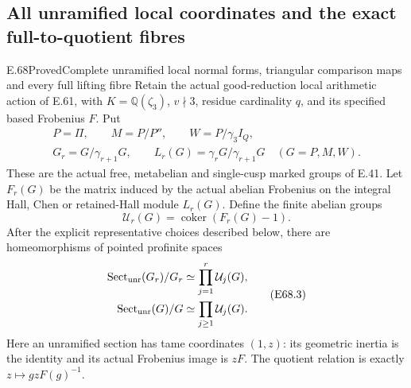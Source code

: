\subsection{All unramified local coordinates and the exact full-to-quotient fibres}

\begin{statement}{E.68}{Proved}{Complete unramified local normal forms, triangular comparison maps and every full lifting fibre}
Retain the actual good-reduction local arithmetic action of E.61,
with $K=\mathbb Q(\zeta_3)$, $v\nmid3$, residue cardinality $q$,
and its specified based Frobenius $F$. Put
\[
 \begin{gathered}
 P=\Pi,\qquad M=P/P'',\qquad W=P/\gamma_3I_Q,\\
 G_r=G/\gamma_{r+1}G,\qquad
 L_r(G)=\gamma_rG/\gamma_{r+1}G\quad(G=P,M,W).
 \end{gathered}
 \tag{E68.1}
\]
These are the actual free, metabelian and single-cusp marked
groups of E.41. Let $F_r(G)$ be the matrix induced by the
actual abelian Frobenius on the integral Hall, Chen or
retained-Hall module $L_r(G)$. Define the finite abelian groups
\[
             \mathcal U_r(G)
               =\operatorname{coker}(F_r(G)-1).
 \tag{E68.2}
\]
After the explicit representative choices described below,
there are homeomorphisms of pointed profinite spaces
\[
 \begin{split}
 \operatorname{Sect}_{\rm unr}(G_r)/G_r
       &\simeq\prod_{j=1}^{r}\mathcal U_j(G),\\
 \operatorname{Sect}_{\rm unr}(G)/G
       &\simeq\prod_{j\ge1}\mathcal U_j(G).
 \end{split}
 \tag{E68.3}
\]
Here an unramified section has tame coordinates $(1,z)$:
its geometric inertia is the identity and its actual
Frobenius image is $zF$. The quotient relation is exactly
$z\mapsto g zF(g)^{-1}$.


\end{statement}
